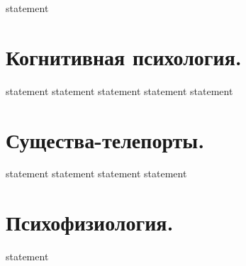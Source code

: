 {statement}

\section{Когнитивная психология.}

{statement}
{statement}
{statement}
{statement}
{statement}

\section{Существа-телепорты.}

{statement}
{statement}
{statement}
{statement}

\section{Психофизиология.}

{statement}